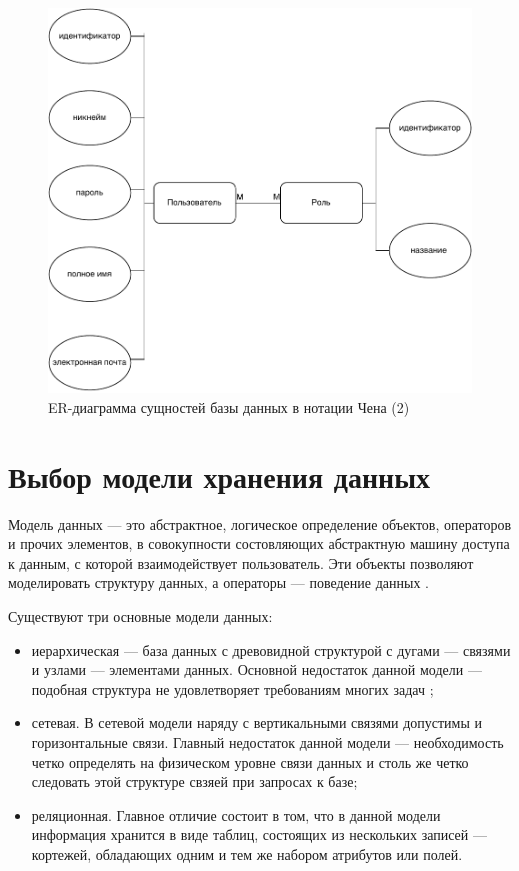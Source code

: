 \begin{figure}[h!]
	\begin{center}
		\includegraphics[scale=0.8]{inc/img/er2.pdf}
	\end{center}
	\captionsetup{justification=centering}
	\caption{ER-диаграмма сущностей базы данных в нотации Чена (2)}
	\label{img:er2}
\end{figure}



\section{Выбор модели хранения данных}

Модель данных --- это абстрактное, логическое определение объектов, операторов и прочих элементов, в совокупности состовляющих абстрактную машину доступа к данным, с которой взаимодействует пользователь. Эти объекты позволяют моделировать структуру данных, а операторы --- поведение данных \cite{1}.  

Существуют три основные модели данных:

\begin{itemize}
	\item иерархическая --- база данных с древовидной структурой с дугами --- связями и узлами --- элементами данных. Основной недостаток данной модели --- подобная структура не удовлетворяет требованиям многих задач \cite{2};
 	\item сетевая. В сетевой модели наряду с вертикальными связями допустимы и горизонтальные связи. Главный недостаток данной модели --- необходимость четко определять на физическом уровне связи данных и столь же четко следовать этой структуре свзяей при запросах к базе;
  	\item реляционная. Главное отличие состоит в том, что в данной модели информация хранится в виде таблиц, состоящих из нескольких записей --- кортежей, обладающих одним и тем же набором атрибутов или полей.  
\end{itemize}

